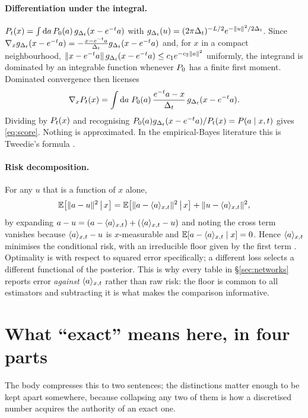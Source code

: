 \paragraph{Differentiation under the integral.}
$P_t(x) = \int\mathrm{d}a\,P_0(a)\,g_{\Delta_t}(x-e^{-t}a)$ with
$g_{\Delta_t}(u) = (2\pi\Delta_t)^{-L/2}e^{-\|u\|^2/2\Delta_t}$. Since
$\nabla_x g_{\Delta_t}(x-e^{-t}a) = -\frac{x-e^{-t}a}{\Delta_t}g_{\Delta_t}(x-e^{-t}a)$ and, for $x$ in a
compact neighbourhood, $\|x-e^{-t}a\|\,g_{\Delta_t}(x-e^{-t}a) \le c_1 e^{-c_2\|a\|^2}$ uniformly, the
integrand is dominated by an integrable function whenever $P_0$ has a finite first moment.
Dominated convergence then licenses
\[
\nabla_x P_t(x)
= \int \mathrm{d}a\; P_0(a)\,\frac{e^{-t}a - x}{\Delta_t}\, g_{\Delta_t}(x-e^{-t}a).
\]
Dividing by $P_t(x)$ and recognising $P_0(a)g_{\Delta_t}(x-e^{-t}a)/P_t(x) = P(a\mid x,t)$ gives
\eqref{eq:score}. Nothing is approximated. In the empirical-Bayes literature this is Tweedie's
formula \citep{robbins1956,miyasawa1961,efron2011}.

\paragraph{Risk decomposition.} For any $u$ that is a function of $x$ alone,
\begin{equation}
\label{eq:orthogonal}
\mathbb{E}\!\left[\|a-u\|^2 \,\middle|\, x\right]
= \mathbb{E}\!\left[\|a - \langle a \rangle_{x,t}\|^2 \,\middle|\, x\right] + \|u - \langle a \rangle_{x,t}\|^2 ,
\end{equation}
by expanding $a-u = (a-\langle a \rangle_{x,t}) + (\langle a \rangle_{x,t}-u)$ and noting the cross term vanishes because
$\langle a \rangle_{x,t}-u$ is $x$-measurable and $\mathbb{E}[a-\langle a \rangle_{x,t}\mid x]=0$. Hence $\langle a \rangle_{x,t}$ minimises the
conditional risk, with an irreducible floor given by the first term \citep{lehmann1998}.
Optimality is with respect to squared error specifically; a different loss selects a different
functional of the posterior. This is why every table in \S\ref{sec:networks} reports error
\emph{against} $\langle a \rangle_{x,t}$ rather than raw risk: the floor is common to all estimators and
subtracting it is what makes the comparison informative.

\section{What ``exact'' means here, in four parts}
\label{app:exactness}

The body compresses this to two sentences; the distinctions matter enough to be kept apart
somewhere, because collapsing any two of them is how a discretised number acquires the authority
of an exact one.

